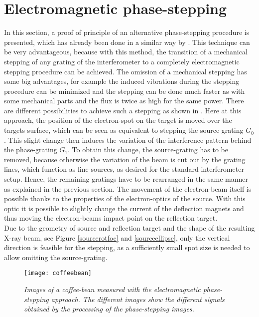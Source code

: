 \section{Electromagnetic phase-stepping}\label{sec:emstepp}
In this section, a proof of principle of an alternative phase-stepping procedure is presented, which has already been done in a similar way by \citep{Harmon2015}. This technique can be very advantageous, because with this method, the transition of a mechanical stepping of any grating of the interferometer to a completely electromagnetic stepping procedure can be achieved. The omission of a mechanical stepping has some big advantages, for example the induced vibrations during the stepping procedure can be minimized and the stepping can be done much faster as with some mechanical parts and the flux is twice as high for the same power. There are different possibilities to achieve such a stepping as shown in \citep{Harmon2015}. Here at this approach, the position of the electron-spot on the target is moved over the targets surface, which can be seen as equivalent to stepping the source grating $G_{0}$. This slight change then induces the variation of the interference pattern behind the phase-grating $G_{1}$. To obtain this change, the source-grating has to be removed, because otherwise the variation of the beam is cut out by the grating lines, which function as line-sources, as desired for the standard interferometer-setup. Hence, the remaining gratings have to be rearranged in the same manner as explained in the previous section. The movement of the electron-beam itself is possible thanks to the properties of the electron-optics of the source. With this optic it is possible to slightly change the current of the deflection magnets and thus moving the electron-beams impact point on the reflection target.\\ Due to the geometry of source and reflection target and the shape of the resulting X-ray beam, see Figure \ref{sourcerotfoc} and \ref{sourceellipse}, only the vertical direction is feasible for the stepping, as a sufficiently small spot size is needed to allow omitting the source-grating.
\begin{figure}%
	\begin{center}
		\texttt{[image: coffeebean]}
	\end{center}
	\caption[Images of a coffee-bean for the different phase-stepping signals]{\textit{Images of a coffee-bean measured with the electromagnetic phase-stepping approach. The different images show the different signals obtained by the processing of the phase-stepping images.}}
	\label{bean}
\end{figure}
